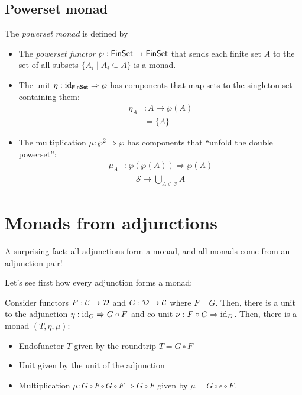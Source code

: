 \subsection{Powerset monad}
The \emph{powerset monad} is defined by

\begin{itemize}
    \item The \emph{powerset functor} $\wp : \mathsf{FinSet} \to \mathsf{FinSet}$ that sends 
    each finite set $A$ to the set of all subsets $\{A_i \mid A_i \subseteq A\}$
    is a monad.
    \item The unit $\eta : \operatorname{id}_{\mathsf{FinSet}} \Rightarrow \wp$ has components that 
    map sets to the singleton set containing them:
    \begin{align*}
        \eta_A &: A \to \wp(A) \\ 
        &= \{A\}
    \end{align*}
    \item The multiplication $\mu : \wp^2 \Rightarrow \wp$ 
    has components that ``unfold the double powerset'':
    \begin{align*}
        \mu_A &: \wp(\wp(A)) \Rightarrow \wp(A) \\
        &= \mathcal{S} \mapsto \bigcup_{A \in \mathcal{S}} A
    \end{align*}
\end{itemize}

\section{Monads from adjunctions}
A surprising fact: all adjunctions form a monad, and all monads 
come from an adjunction pair!

Let's see first how every adjunction forms a monad:

\begin{proposition}
    Consider functors $F : \mathcal C \to \mathcal D$ and $G : \mathcal D \to \mathcal C$ 
    where $F \dashv G$. Then, there is a unit to the 
    adjunction $\eta : \operatorname{id}_C \Rightarrow G \circ F$ 
    and co-unit $\nu : F \circ G \Rightarrow \operatorname{id}_D$.
    Then, there is a monad $(T, \eta, \mu)$:
    \begin{itemize}[noitemsep]
        \item Endofunctor $T$ given by the roundtrip $T = G \circ F$
        \item Unit given by the unit of the adjunction
        \item Multiplication $\mu : G \circ F \circ G \circ F \Rightarrow G \circ F$
        given by $\mu = G \circ \epsilon \circ F$.
    \end{itemize}

\end{proposition}

